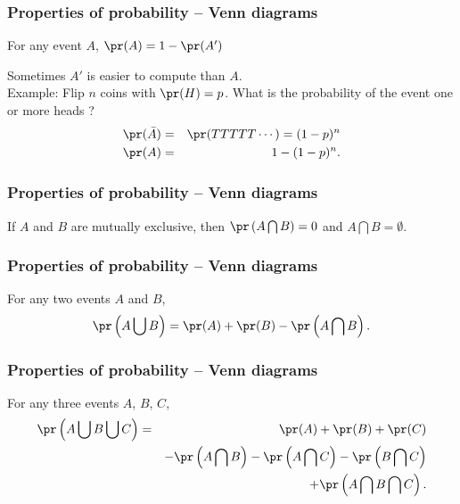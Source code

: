 \begin{frame}[fragile]\frametitle{Properties of probability -- Venn diagrams}

\begin{prop}
For any event $A$, $\pr(A) = 1- \pr(A')$ 
\end{prop} 

\vspace{.1in}

Sometimes $A'$ is easier to compute than $A$. \\ 
Example: Flip $n$ coins with $\pr(H) = p$. What is the 
probability of the event one or more heads ?
\begin{eqnarray*}
\pr(\bar{A}) &= &\pr(TTTTT\cdots) = (1-p)^n \\
\pr(A) &= & 1- (1-p)^n.
\end{eqnarray*}
\end{frame}

\begin{frame}[fragile]\frametitle{Properties of probability -- Venn diagrams}


\begin{prop}
If $A$ and $B$ are mutually exclusive, then 
$\pr\left(A \bigcap B\right) = 0$ and $A \bigcap B = \emptyset$. 
\end{prop}

\end{frame}


\begin{frame}[fragile]\frametitle{Properties of probability -- Venn diagrams}


\begin{prop}
For any two events $A$ and $B$, 
$$\pr\left(A \bigcup B\right) = \pr(A) +\pr(B) - \pr\left(A \bigcap B\right).$$
\end{prop}

\end{frame}


\begin{frame}[fragile]\frametitle{Properties of probability -- Venn diagrams}

For any three events $A$, $B$, $C$,
\begin{eqnarray*}
\pr \left(A \bigcup B  \bigcup C \right) &= &\pr(A) +\pr(B)+ \pr(C)\\
& & - \pr \left(A \bigcap B\right)- \pr\left(A \bigcap C \right) - \pr\left(B
  \bigcap C \right)\\
& & + \pr\left(A \bigcap B \bigcap C \right).
\end{eqnarray*}

\end{frame}

